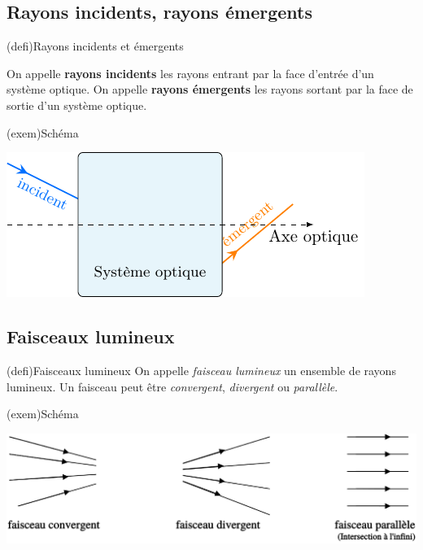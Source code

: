 \documentclass[../../main/main.tex]{subfiles}
\begin{document}
\subsection{Rayons incidents, rayons émergents}

\begin{tcbraster}[raster columns=2, raster equal height=rows]

	\begin{tcb}[label=def:rlie](defi){Rayons incidents et émergents}

		On appelle \textbf{rayons incidents} les rayons entrant par la face
		d'entrée d'un système optique. On appelle \textbf{rayons émergents} les
		rayons sortant par la face de sortie d'un système optique.

	\end{tcb}
	\begin{tcb}[width=\linewidth](exem){Schéma}
		\begin{center}
			\includegraphics[width=\linewidth]{syst_opt_ie.pdf}
			\label{fig:socent}
		\end{center}
	\end{tcb}
\end{tcbraster}

\subsection{Faisceaux lumineux}

\begin{tcbraster}[raster columns=4, raster equal height=rows]
	\begin{tcb}[label=def:faisceau](defi){Faisceaux lumineux}
		On appelle \textit{faisceau lumineux} un ensemble de rayons lumineux. Un
		faisceau peut être \textit{convergent}, \textit{divergent} ou
		\textit{parallèle}.
	\end{tcb}
	\begin{tcb}[raster multicolumn=3](exem){Schéma}
		\begin{center}
			\includegraphics[width=\linewidth]{ch2_fig8.png}
			\label{fig:faisceau}
		\end{center}
	\end{tcb}
\end{tcbraster}
\end{document}
